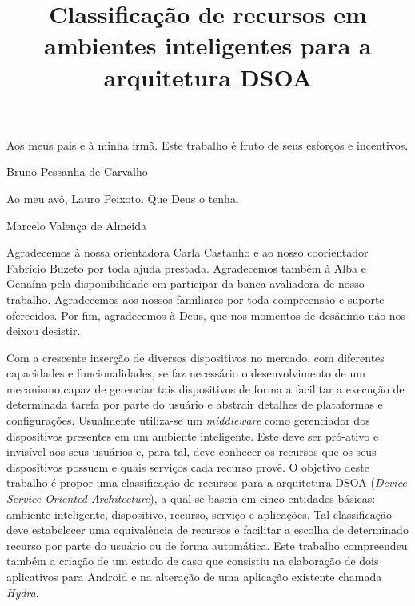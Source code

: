 \documentclass[bacharelado]{unb-cic}
\title{Classificação de recursos em ambientes inteligentes para a arquitetura DSOA}
\begin{document}
  \lstset{tabsize=4}
  \renewcommand\lstlistingname{Listagem}
  \renewcommand\lstlistlistingname{Listagens}
  \maketitle
  \pretextual

  \begin{dedicatoria}
  Aos meus pais e à minha irmã. Este trabalho é fruto de seus esforços e incentivos.
  \begin{flushright}Bruno Pessanha de Carvalho\end{flushright}

  Ao meu avô, Lauro Peixoto. Que Deus o tenha.
  \begin{flushright}Marcelo Valença de Almeida\end{flushright}
  \end{dedicatoria}

  \begin{agradecimentos}
  Agradecemos à nossa orientadora \dr[a] Carla Castanho e ao nosso coorientador Fabrício Buzeto por toda ajuda prestada. Agradecemos também à \dr[a] Alba e \dr[a] Genaína pela disponibilidade em participar da banca avaliadora de nosso trabalho. Agradecemos aos nossos familiares por toda compreensão e suporte oferecidos. Por fim, agradecemos à Deus, que nos momentos de desânimo não nos deixou desistir.
  \end{agradecimentos}

  \begin{resumo}
  Com a crescente inserção de diversos dispositivos no mercado, com diferentes capacidades e funcionalidades, se faz necessário o desenvolvimento de um mecanismo capaz de gerenciar tais dispositivos de forma a facilitar a execução de determinada tarefa por parte do usuário e abstrair detalhes de plataformas e configurações. Usualmente utiliza-se um \emph{middleware} como gerenciador dos dispositivos presentes em um ambiente inteligente. Este deve ser pró-ativo e invisível aos seus usuários e, para tal, deve conhecer os recursos que os seus dispositivos possuem e quais serviços cada recurso provê. O objetivo deste trabalho é propor uma classificação de recursos para a arquitetura DSOA (\emph{Device Service Oriented Architecture}), a qual se baseia em cinco entidades básicas: ambiente inteligente, dispositivo, recurso, serviço e aplicações. Tal classificação deve estabelecer uma equivalência de recursos e facilitar a escolha de determinado recurso por parte do usuário ou de forma automática. Este trabalho compreendeu também a criação de um estudo de caso que consistiu na elaboração de dois aplicativos para Android e na alteração de uma aplicação existente chamada \emph{Hydra}. 

  \end{resumo}
\end{document}
